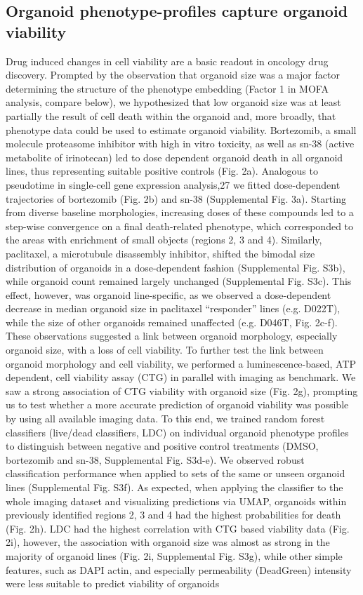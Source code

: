 \begin{flushleft}
\section{Organoid phenotype-profiles capture organoid viability}

Drug induced changes in cell viability are a basic readout in oncology drug discovery. Prompted by the observation that organoid size was a major factor determining the structure of the phenotype embedding (Factor 1 in MOFA analysis, compare below), we hypothesized that low organoid size was at least partially the result of cell death within the organoid and, more broadly, that phenotype data could be used to estimate organoid viability. Bortezomib, a small molecule proteasome inhibitor with high in vitro toxicity, as well as sn-38 (active metabolite of irinotecan) led to dose dependent organoid death in all organoid lines, thus representing suitable positive controls (Fig. 2a). Analogous to pseudotime in single-cell  gene expression analysis,27 we fitted dose-dependent trajectories of bortezomib (Fig. 2b) and sn-38 (Supplemental Fig. 3a). Starting from diverse baseline morphologies, increasing doses of these compounds led to a step-wise convergence on a final death-related phenotype, which corresponded to the areas with enrichment of small objects (regions 2, 3 and 4). Similarly, paclitaxel, a microtubule disassembly inhibitor, shifted the bimodal size distribution of organoids in a dose-dependent fashion (Supplemental Fig. S3b), while organoid count remained largely unchanged (Supplemental Fig. S3c). This effect, however, was organoid line-specific, as we observed a dose-dependent decrease in median organoid size in paclitaxel “responder” lines (e.g. D022T), while the size of other organoids remained unaffected (e.g. D046T, Fig. 2c-f). These observations suggested a link between organoid morphology, especially organoid size, with a loss of cell viability. To further test the link between organoid morphology and cell viability, we performed a luminescence-based, ATP dependent, cell viability assay (CTG) in parallel with imaging as benchmark. We saw a strong association of CTG viability with organoid size (Fig. 2g), prompting us to test whether a more accurate prediction of organoid viability was possible by using all available imaging data. To this end, we trained random forest classifiers (live/dead classifiers, LDC) on individual organoid phenotype profiles to distinguish between negative and positive control treatments (DMSO, bortezomib and sn-38, Supplemental Fig. S3d-e). We observed robust classification performance when applied to sets of the same or unseen organoid lines (Supplemental Fig. S3f). As expected, when applying the classifier to the whole imaging dataset and visualizing predictions via UMAP, organoids within previously identified regions 2, 3 and 4 had the highest probabilities for death (Fig. 2h). LDC had the highest correlation with CTG based viability data (Fig. 2i), however, the association with organoid size was almost as strong in the majority of organoid lines (Fig. 2i, Supplemental Fig. S3g), while other simple features, such as DAPI actin, and especially permeability (DeadGreen) intensity were less suitable to predict viability of organoids 
\end{flushleft}
